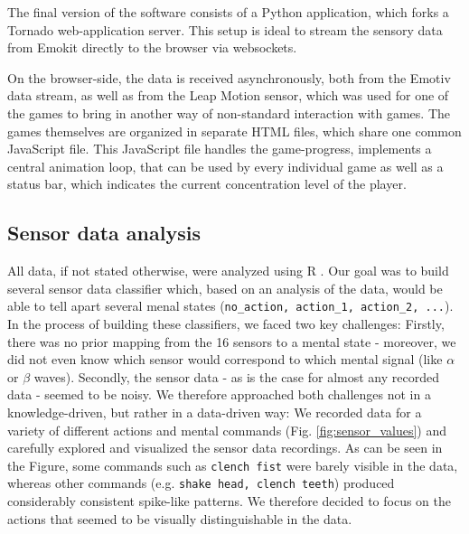 \documentclass{utue} %
\begin{document}
The final version of the software consists of a Python application, which forks a Tornado web-application server. This setup is ideal to stream the sensory data from Emokit directly to the browser via websockets. 

On the browser-side, the data is received asynchronously, both from the Emotiv data stream, as well as from the Leap Motion sensor, which was used for one of the games to bring in another way of non-standard interaction with games. The games themselves are organized in separate HTML files, which share one common JavaScript file. This JavaScript file handles the game-progress, implements a central animation loop, that can be used by every individual game as well as a status bar, which indicates the current concentration level of the player.


\subsection{Sensor data analysis}
All data, if not stated otherwise, were analyzed using R \cite{RCoreTeam}. Our goal was to build several sensor data classifier which, based on an analysis of the data, would be able to tell apart several menal states (\texttt{no\_action, action\_1, action\_2, ...}). In the process of building these classifiers, we faced two key challenges: Firstly, there was no prior mapping from the 16 sensors to a mental state - moreover, we did not even know which sensor would correspond to which mental signal (like $ \alpha $ or $ \beta $ waves). Secondly, the sensor data - as is the case for almost any recorded data - seemed to be noisy. We therefore approached both challenges not in a knowledge-driven, but rather in a data-driven way: We recorded data for a variety of different actions and mental commands (Fig. \ref{fig:sensor_values}) and carefully explored and visualized the sensor data recordings. As can be seen in the Figure, some commands such as \texttt{clench fist} were barely visible in the data, whereas other commands (e.g. \texttt{shake head, clench teeth}) produced considerably consistent spike-like patterns. We therefore decided to focus on the actions that seemed to be visually distinguishable in the data.
\end{document}
